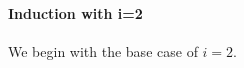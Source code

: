 

    

    
    
    

    
    
    


    
    

    \paragraph{Induction with i=2}
    We begin with the base case of $i=2$.

